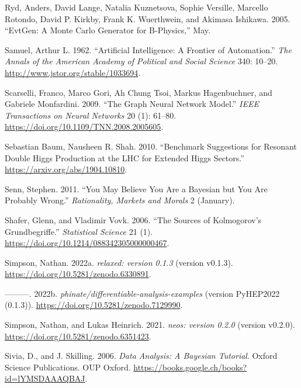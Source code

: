 \documentclass[
  11pt,
  numbers=noendperiod]{book}
\newlength{\cslhangindent}
\newlength{\cslentryspacingunit} %
\newenvironment{CSLReferences}[2] %
 {%
  \setlength{\parindent}{0pt}
  \ifodd #1
  \let\oldpar\par
  \def\par{\hangindent=\cslhangindent\oldpar}
  \fi
  \setlength{\parskip}{#2\cslentryspacingunit}
 }%
 {}
\begin{document}
\begin{CSLReferences}{1}{0}
\leavevmode{}%
Ryd, Anders, David Lange, Natalia Kuznetsova, Sophie Versille, Marcello
Rotondo, David P. Kirkby, Frank K. Wuerthwein, and Akimasa Ishikawa.
2005. {``{EvtGen: A Monte Carlo Generator for B-Physics},''} May.

\leavevmode{}%
Samuel, Arthur L. 1962. {``Artificial Intelligence: A Frontier of
Automation.''} \emph{The Annals of the American Academy of Political and
Social Science} 340: 10--20. \url{http://www.jstor.org/stable/1033694}.

\leavevmode{}%
Scarselli, Franco, Marco Gori, Ah Chung Tsoi, Markus Hagenbuchner, and
Gabriele Monfardini. 2009. {``The Graph Neural Network Model.''}
\emph{IEEE Transactions on Neural Networks} 20 (1): 61--80.
\url{https://doi.org/10.1109/TNN.2008.2005605}.

\leavevmode{}%
Sebastian Baum, Nausheen R. Shah. 2010. {``{Benchmark Suggestions for
Resonant Double Higgs Production at the LHC for Extended Higgs
Sectors}.''} \url{https://arxiv.org/abs/1904.10810}.

\leavevmode{}%
Senn, Stephen. 2011. {``You May Believe You Are a Bayesian but You Are
Probably Wrong.''} \emph{Rationality, Markets and Morals} 2 (January).

\leavevmode{}%
Shafer, Glenn, and Vladimir Vovk. 2006. {``The Sources of Kolmogorov's
Grundbegriffe.''} \emph{Statistical Science} 21 (1).
\url{https://doi.org/10.1214/088342305000000467}.

\leavevmode{}%
Simpson, Nathan. 2022a. \emph{{relaxed: version 0.1.3}} (version
v0.1.3). \url{https://doi.org/10.5281/zenodo.6330891}.

\leavevmode{}%
---------. 2022b. \emph{{phinate/differentiable-analysis-examples}}
(version PyHEP2022 (0.1.3)).
\url{https://doi.org/10.5281/zenodo.7129990}.

\leavevmode{}%
Simpson, Nathan, and Lukas Heinrich. 2021. \emph{{neos: version 0.2.0}}
(version v0.2.0). \url{https://doi.org/10.5281/zenodo.6351423}.

\leavevmode{}%
Sivia, D., and J. Skilling. 2006. \emph{Data Analysis: A Bayesian
Tutorial}. Oxford Science Publications. OUP Oxford.
\url{https://books.google.ch/books?id=lYMSDAAAQBAJ}.


\end{CSLReferences}
\end{document}
